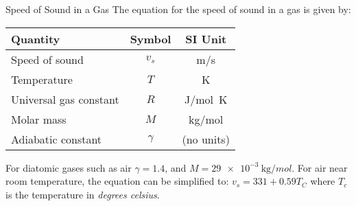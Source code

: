\documentclass[12pt,aspectratio=169]{beamer}
\newcommand{\eq}[2]{\vspace{#1}{\Large\begin{displaymath}#2\end{displaymath}}}
\begin{document}
\begin{frame}{Speed of Sound in a Gas}
  The equation for the speed of sound in a gas is given by:
  
  \eq{-.2in}{
    \boxed{v_s=\sqrt{\frac{\gamma RT}{M}}}
  }
  \begin{center}
    \begin{tabular}{l|c|c}
      \rowcolor{pink}
      \textbf{Quantity} & \textbf{Symbol} & \textbf{SI Unit} \\ \hline
      Speed of sound         & $v_s$    & \si{m/s}\\
      Temperature            & $T$      & \si{\kelvin}\\
      Universal gas constant & $R$      & \si{J/mol.K}\\
      Molar mass             & $M$      & \si{\kilo\gram/mol}\\
      Adiabatic constant     & $\gamma$ & (no units)
    \end{tabular}
  \end{center}
  For diatomic gases such as air $\gamma=1.4$, and
  $M=\SI{29e-3}{\kilo\gram/mol}$. For air near room temperature, the equation
  can be simplified to: $\boxed{v_s=331+0.59T_C}$ where $T_c$ is the
  temperature in \emph{degrees celsius}.
\end{frame}
\end{document}
